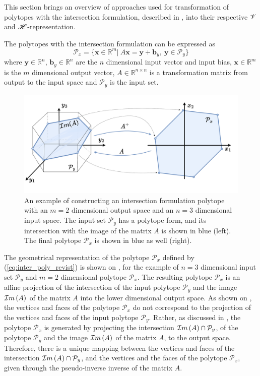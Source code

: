This section brings an overview of approaches used for transformation of polytopes with the intersection formulation, described in , into their respective $\mathscr{V}$ and $\mathscr{H}$-representation. 

The polytopes with the intersection formulation can be expressed as
\begin{equation}
    \mathcal{P}_x=\{\bm{x}\in\mathbb{R}^m |~ A\bm{x} = \bm{y} + \bm{b}_y,~\bm{y} \in \mathcal{P}_y  \}
    \label{eq:inter_poly_revist}
\end{equation}
where $\bm{y}\in\mathbb{R}^n$, $\bm{b}_y\in\mathbb{R}^n$ are the $n$ dimensional input vector and input bias, $\bm{x}\in\mathbb{R}^m$ is the $m$ dimensional output vector, $A\in\mathbb{R}^{n\times n}$ is a transformation matrix from output to the input space and $\mathcal{P}_y$ is the input set.

\label{ch:inter_poly_chapter}
\begin{figure}[h]
    \centering
    \includegraphics[width=0.8\linewidth]{Chapters/imgs/inter_poly.pdf}
    \caption{An example of constructing an intersection formulation polytope with an $m=2$ dimensional output space and an $n=3$ dimensional input space. The input set $\mathcal{P}_y$ has a polytope form, and its intersection with the image of the matrix $A$ is shown in blue (left). The final polytope $\mathcal{P}_x$ is shown in blue as well (right).}
    \label{fig:inter_poly}
\end{figure}

The geometrical representation of the polytope $\mathcal{P}_x$ defined by (\ref{eq:inter_poly_revist}) is shown on , for the example of $n=3$ dimensional input set $\mathcal{P}_y$ and $m=2$ dimensional polytope $\mathcal{P}_x$. 
The resulting polytope $\mathcal{P}_x$ is an affine projection of the intersection of the input polytope $\mathcal{P}_y$ and the image $\mathcal{I}m\left(A\right)$ of the matrix $A$ into the lower dimensional output space. As shown on , the vertices and faces of the polytope $\mathcal{P}_x$ do not correspond to the projection of the vertices and faces of the input polytope $\mathcal{P}_y$. 
Rather, as discussed in , the polytope $\mathcal{P}_x$ is generated by projecting the intersection $\mathcal{I}m\left(A\right)\cap\mathcal{P}_y$, of the polytope $\mathcal{P}_y$ and the image $\mathcal{I}m\left(A\right)$ of the matrix $A$, to the output space. 
Therefore, there is a unique mapping between the vertices and faces of the intersection $\mathcal{I}m\left(A\right)\cap\mathcal{P}_y$, and the vertices and the faces of the polytope $\mathcal{P}_x$, given through the pseudo-inverse inverse \cite{wang2018generalized} of the matrix $A$. 

